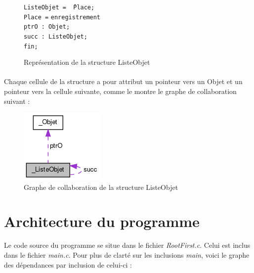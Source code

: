 \documentclass[twoside,UTF8]{EPURapport}
\begin{document}
\begin{figure}[H]

\begin{tabbing}
\texttt{ListeObjet = \^\,Place;} \\
\texttt{Place =} \= \texttt{enregistrement} \\
\> \texttt{ptrO : Objet;} \\
\> \texttt{succ : ListeObjet;} \\
\> \texttt{fin; } \\
\end{tabbing}

\caption{Représentation de la structure ListeObjet}
\end{figure}

\paragraph{}
Chaque cellule de la structure a pour attribut un pointeur vers un Objet et un pointeur vers la cellule suivante, comme le montre le graphe de collaboration suivant : 

\begin{figure}[H]
\center
\includegraphics[scale=0.5]{images/struct_listeobjet.png}
\caption{Graphe de collaboration de la structure ListeObjet}
\end{figure} 

\section{Architecture du programme}

\paragraph{}
Le code source du programme se situe dans le fichier \textit{RootFirst.c}. Celui est inclus dans le fichier \textit{main.c}. 
Pour plus de clarté sur les inclusions \textit{main}, voici le graphe des dépendances par inclusion de celui-ci : 
\end{document}
